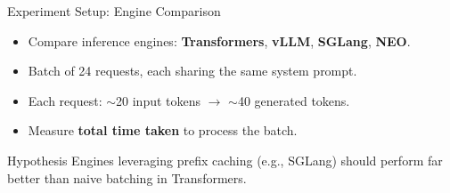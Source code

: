 \documentclass[Serif, 10pt, brown]{beamer}
\theoremstyle{example}
\theoremstyle{plain}
\begin{document}
\begin{frame}{Experiment Setup: Engine Comparison}
\begin{itemize}
    \item Compare inference engines: \textbf{Transformers}, \textbf{vLLM}, \textbf{SGLang}, \textbf{NEO}.
    \item Batch of 24 requests, each sharing the same system prompt.
    \item Each request: $\sim$20 input tokens $\rightarrow$ $\sim$40 generated tokens.
    \item Measure \textbf{total time taken} to process the batch.
\end{itemize}

\begin{block}{Hypothesis}
Engines leveraging prefix caching (e.g., SGLang) should perform far better than naive batching in Transformers.
\end{block}
\end{frame}
\end{document}
